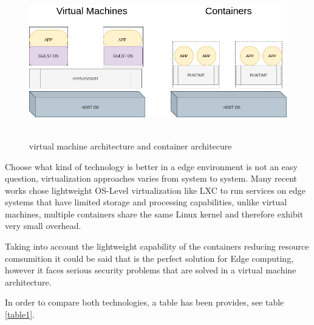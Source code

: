 \begin{figure}[h]%
    \includegraphics[width=6.5in]{figures/virt_container.png}
~\caption{virtual machine architecture and container architecure}
\label{figure2.2}
\end{figure}

Choose what kind of technology is better in a edge environment is not an easy question, virtualization approaches varies from system to system. Many recent works chose lightweight OS-Level virtualization like LXC to run services on edge systems that have limited storage and processing capabilities, unlike virtual machines, multiple containers share the same Linux kernel and therefore exhibit very small overhead.~\cite{ACM:clixue:2018}



Taking into account the lightweight capability of the containers reducing resource comsumition it could be said that is the perfect solution for Edge computing, however it faces serious security problems that are solved in a virtual machine architecture. 

\newpage

In order to compare both technologies, a table has been provides, see table \ref{table1}.

